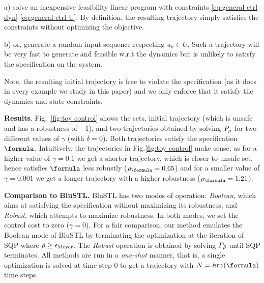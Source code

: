  a) solve an inexpensive feasibility linear program with constraints \eqref{eq:general ctrl dyn}-\eqref{eq:general ctrl U}. By definition, the resulting trajectory simply satisfies the constraints without optimizing the objective.
 
 b) or, generate a random input sequence respecting $u_k \in U$. 
 Such a trajectory will be very fast to generate and feasible w.r.t the dynamics but is unlikely to satisfy the specification on the system. 

Note, the resulting initial trajectory is free to violate the specification (as it does in every example we study in this paper) and we only enforce that it satisfy the dynamics and state constraints.


\textbf{Results}.
Fig.~\ref{fig:toy control} shows the sets, initial trajectory (which is unsafe and has a robustness of $-1$), and two trajectories obtained by solving $P_{\tilde{\rho}}$ for two different values of $\gamma$ (with $\delta=0$). Both trajectories satisfy the specification $\formula$. Intuitively, the trajectories in Fig.\ref{fig:toy control} make sense, as for a higher value of $\gamma=0.1$ we get a shorter trajectory, which is closer to unsafe set, hence satisfies $\formula$ less robustly ($\rob_{\formula}=0.65$) and for a smaller value of $\gamma=0.001$ we get a longer trajectory with a higher robustness ($\rob_{\formula}=1.21$).

\textbf{Comparison to BluSTL.}
BluSTL has two modes of operation:  \textit{Boolean}, which aims at satisfying the specification without maximizing its robustness, and \textit{Robust}, which attempts to maximize robustness. 
In both modes, we set the control cost to zero ($\gamma=0$). 
For a fair comparison, our method emulates the Boolean mode of BluSTL by terminating the optimization at the iteration of SQP where $\tilde{\rho} \geq \epsilon_{\text{Meyer}}$.
The \textit{Robust} operation is obtained by solving $P_{\tilde{\rho}}$ until SQP terminates. 
All methods are run in a \textit{one-shot} manner, that is, a single optimization is solved at time step $0$ to get a trajectory with $N = hrz(\formula)$ time steps.

